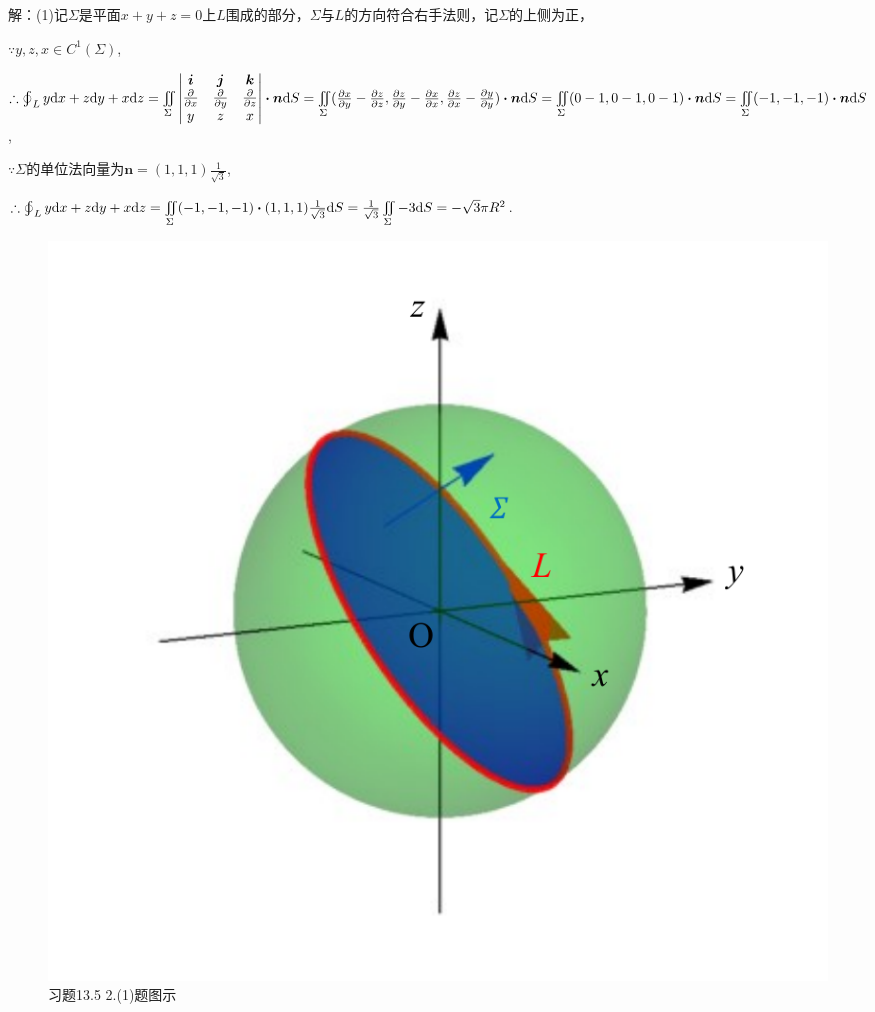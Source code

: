 \documentclass[12pt,UTF8,fleqn]{ctexart}
\newcommand{\BLOInt}[2]{\varoint\nolimits_{#1}#2}
\newcommand{\md}[1]{\mathrm d#1}
\newcommand{\BSIInt}[2]{\iint\limits_{#1}#2}
\newcommand{\pp}[2]{\frac{\partial #1}{\partial #2}}
\begin{document}
\begin{enumerate}
解：(1)记$\Sigma$是平面$x+y+z=0$上$L$围成的部分，$\Sigma$与$L$的方向符合右手法则，记$\Sigma$的上侧为正，

$\because y,z,x\in C^1(\Sigma)$,

$\therefore\BLOInt L{y\md x+z\md y+x\md z}=\BSIInt\Sigma{\begin{vmatrix}
\bm i&\bm j&\bm k\\
\frac\partial{\partial x}&\frac\partial{\partial y}&\frac\partial{\partial z}\\
y&z&x
\end{vmatrix}\bm\cdot\bm n\md S}=\BSIInt\Sigma{(\pp xy-\pp zz,\pp zy-\pp xx,\pp zx-\pp yy)\bm\cdot\bm n\md S}\\
=\BSIInt\Sigma{(0-1,0-1,0-1)\bm\cdot\bm n\md S}=\BSIInt\Sigma{(-1,-1,-1)\bm\cdot\bm n\md S}$,

$\because\Sigma$的单位法向量为$\bm n=(1,1,1)\frac1{\sqrt3}$,

$\therefore\BLOInt L{y\md x+z\md y+x\md z}=\BSIInt\Sigma{(-1,-1,-1)\bm\cdot(1,1,1)\frac1{\sqrt3}\md S}=\frac1{\sqrt3}\BSIInt\Sigma{-3\md S}=-\sqrt3\pi R^2$.

\begin{figure}[H]
\begin{center}
\includegraphics[height=0.5\textheight]{Figures24/Fig13-5-2-1.pdf}
\end{center}
\caption{习题13.5 2.(1)题图示}
\label{13-5-2-1}
\end{figure}


\end{enumerate}
\end{document}
